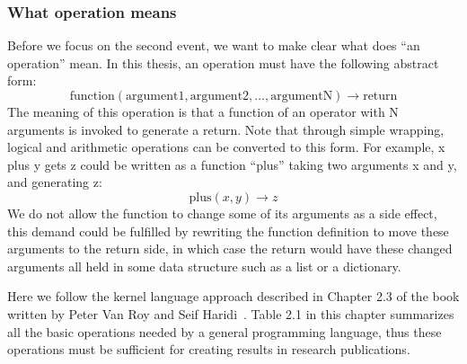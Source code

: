 \subsubsection{What operation means}
Before we focus on the second event, we want to make clear what does ``an operation'' mean. In this thesis, an operation must have the following abstract form:
\begin{equation}
\label{eq:fun}
\textrm{function}(\textrm{argument1}, \textrm{argument2}, \dots, \textrm{argumentN})\rightarrow \textrm{return}
\end{equation}
The meaning of this operation is that a function of an operator with N arguments is invoked to generate a return. Note that through simple wrapping, logical and arithmetic operations can be converted to this form. For example, x plus y gets z could be written as a function ``plus'' taking two arguments x and y, and generating z:
\begin{equation}
\textrm{plus}(x, y)\rightarrow z
\end{equation}
We do not allow the function to change some of its arguments as a side effect, this demand could be fulfilled by rewriting the function definition to move these arguments to the return side, in which case the return would have these changed arguments all held in some data structure such as a list or a dictionary.

Here we follow the kernel language approach described in Chapter 2.3 of the book written by Peter Van Roy and Seif Haridi~\cite{van2004concepts}. Table 2.1 in this chapter summarizes all the basic operations needed by a general programming language, thus these operations must be sufficient for creating results in research publications.

